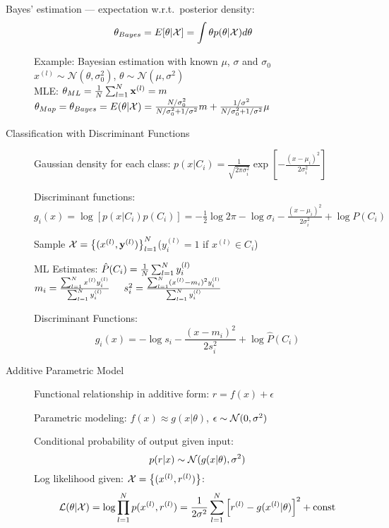     Bayes' estimation --- expectation w.r.t.\ posterior density:
    \[ \theta_{Bayes} = E[\theta|\mathcal{X}] = \int \theta p(\theta|\mathcal{X})d\theta\]
\begin{description}
\item[] Example: Bayesian estimation with known $\mu$, $\sigma$ and $\sigma_0$\\
        $x^{(l)} \sim \mathcal{N}(\theta, \sigma_0^2)$, 
        $\theta  \sim \mathcal{N}(\mu, \sigma^2)$\\
         MLE\@: $\theta_{ML} = \frac{1}{N}\sum_{l=1}^N\mathbf{x}^{(l)}=m$ \\
         $\theta_{Map} = \theta_{Bayes}  =E(\theta|\mathcal{X}) = 
            \frac{N/\sigma_0^2}{N/\sigma_0^2+1/\sigma^2} m +
            \frac{1/\sigma^2}{N/\sigma_0^2 + 1/\sigma^2} \mu$

\item[Classification with Discriminant Functions] 
    Gaussian density for each class: $p(x|C_i) = \frac{1}{\sqrt{2\pi
    \sigma^2_i}} \exp\left[ -\frac{(x-\mu_i)^2}{2\sigma_i^2} \right] $

    Discriminant functions:
    $g_i(x) = \log\left[ p(x|C_i)p(C_i) \right] = -\frac{1}{2}\log 2\pi -
    \log\sigma_i -\frac{(x-\mu_i)^2}{2\sigma^2_i} +\log P(C_i)$

    Sample $\mathcal{X} = \left\{ (x^{(l)}, \mathbf{y}^{(l)}) \right\}^N_{l=1}$($y_i^{(l)} = 1$ if
    $x^{(l)}\in C_i$)

    ML Estimates: $\hat{P}(C_i) = \frac{1}{N}\sum_{l=1}^Ny^{(l)}_i$\\
    $m_i = \frac{\sum_{l=1}^N x^{(l)} y^{(l)}_i}{\sum_{l=1}^Ny^{(l)}_i} \hspace{0.5cm} s_i^2=  \frac{\sum_{l=1}^N
    (x^{(l)} - m_i)^2y^{(l)}_i}{\sum_{l=1}^Ny^{(l)}_i} $

    Discriminant Functions: \[g_i(x) = -\log s_i - \frac{(x-m_i)^2}{2s_i^2} +
    \log \hat{P}(C_i)\]
\item[Additive Parametric Model] Functional relationship in additive form:
    $r = f(x) + \epsilon$

    Parametric modeling: $f(x) \approx g(x|\theta)$, $\epsilon \sim \mathcal{N}(0,
    \sigma^2)$

    Conditional probability of output given input:
    \[p(r|x) \sim \mathcal{N}(g(x|\theta), \sigma^2)\]
    Log likelihood given: $\mathcal{X} = \left\{ (x^{(l)}, r^{(l)}) \right\}$:
    \[
        \mathcal{L}(\theta|\mathcal{X}) = \log \prod_{l=1}^N p(x^{(l)}, r^{(l)}) =
        \frac{1}{2\sigma^2}\sum_{l=1}^N\left[ r^{(l)} - g(x^{(l)}|\theta) \right]^2 +
        \mbox{const}
    \]


\end{description}
